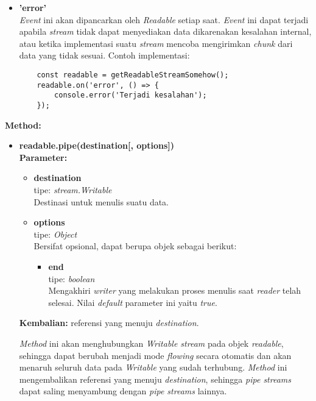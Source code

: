 \begin{enumerate}
\begin{itemize}
\begin{itemize}
				\item \textbf{'error'} \\ \textit{Event} ini akan dipancarkan oleh \textit{Readable} setiap saat. \textit{Event} ini dapat terjadi apabila \textit{stream} tidak dapat menyediakan data dikarenakan kesalahan internal, atau ketika implementasi suatu \textit{stream} mencoba mengirimkan \textit{chunk} dari data yang tidak sesuai. Contoh implementasi:
	\begin{lstlisting}
	const readable = getReadableStreamSomehow();
	readable.on('error', () => {
		console.error('Terjadi kesalahan');
	});
	\end{lstlisting}
	
				
			\end{itemize}
		
		\textbf{Method:}
			\begin{itemize}
				\item \textbf{readable.pipe(destination[, options])} \\ \textbf{Parameter:}
				\begin{itemize}
					\item \textbf{destination} \\tipe: \textit{stream.Writable} \\ Destinasi untuk menulis suatu data.
					\item \textbf{options} \\tipe: \textit{Object} \\ Bersifat opsional, dapat berupa objek sebagai berikut:
					\begin{itemize}
						\item \textbf{end} \\tipe: \textit{boolean} \\ Mengakhiri \textit{writer} yang melakukan proses menulis saat \textit{reader} telah selesai. Nilai \textit{default} parameter ini yaitu \textit{true}.
					\end{itemize}
				\end{itemize}
				\textbf{Kembalian:} referensi yang menuju \textit{destination}.
				
				\textit{Method} ini akan menghubungkan \textit{Writable stream} pada objek \textit{readable}, sehingga dapat berubah menjadi mode \textit{flowing} secara otomatis dan akan menaruh seluruh data pada \textit{Writable} yang sudah terhubung. \textit{Method} ini mengembalikan referensi yang menuju \textit{destination}, sehingga \textit{pipe streams} dapat saling menyambung dengan \textit{pipe streams} lainnya.
				

\end{itemize}
\end{itemize}
\end{enumerate}
